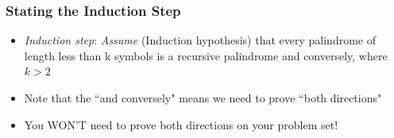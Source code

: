  \begin{frame}
\frametitle{Stating the Induction Step}

\begin{itemize}[<+->]
\item \emph{Induction step}:
\noindent \textit{Assume} (Induction hypothesis) that every palindrome of length less than k symbols is a
recursive palindrome and conversely, where $k > 2$ %

\item Note that the ``and conversely" means we need to prove ``both directions" 

\item You WON'T need to prove both directions on your problem set! 




\end{itemize} 
\end{frame}


